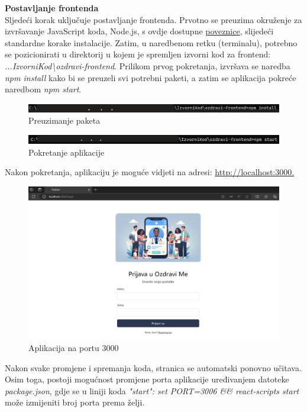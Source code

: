 	\textbf{Postavljanje frontenda}\\
	Sljedeći korak uključuje postavljanje frontenda. Prvotno se preuzima okruženje za izvršavanje JavaScript koda, Node.js, s ovdje dostupne 
	\href{https://nodejs.org/en/download/}{poveznice}, slijedeći standardne korake instalacije. Zatim, u naredbenom retku (terminalu), potrebno se pozicionirati 
	u direktorij u kojem je spremljen izvorni kod za frontend: \textit{...IzvorniKod\textbackslash ozdravi-frontend}. Prilikom prvog pokretanja, izvršava se naredba \textit{npm install} kako bi se 
	preuzeli svi potrebni paketi, a zatim se aplikacija pokreće naredbom \textit{npm start}.
	\begin{figure}[H]
		\includegraphics[width=\textwidth]{slike/npmin.png} 
		\caption{Preuzimanje paketa} 
	\end{figure}
	\begin{figure}[H]
		\includegraphics[width=\textwidth]{slike/npmst.png} 
		\caption{Pokretanje aplikacije} 
	\end{figure}
	
	\newpage \noindent Nakon pokretanja, aplikaciju je moguće vidjeti na adresi: \url{http://localhost:3000.}\\
	\begin{figure}[H]
		\includegraphics[width=\textwidth]{slike/loc3000.png} 
		\caption{Aplikacija na portu 3000} 
	   \end{figure}
	Nakon svake promjene i spremanja koda, stranica se automatski ponovno učitava. Osim toga, postoji mogućnost promjene porta aplikacije uređivanjem datoteke 
	\textit{package.json}, 
	gdje se u liniji koda 
	\textit{"start": set PORT=3006 \&\& react-scripts start} može izmijeniti broj porta prema želji.
	\eject 